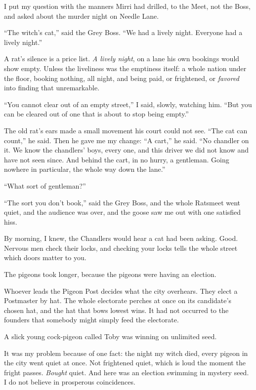 I put my question with the manners Mirri had drilled, to the Meet, not the Boss, and asked about the murder night on Needle Lane.

``The witch's cat,'' said the Grey Boss. ``We had a lively night. Everyone had a lively night.''

A rat's silence is a price list. \emph{A lively night}, on a lane his own bookings would show empty. Unless the liveliness was the emptiness itself: a whole nation under the floor, booking nothing, all night, and being paid, or frightened, or \emph{favored} into finding that unremarkable.

``You cannot clear out of an empty street,'' I said, slowly, watching him. ``But you can be cleared out of one that is about to stop being empty.''

The old rat's ears made a small movement his court could not see. ``The cat can count,'' he said. Then he gave me my change: ``A cart,'' he said. ``No chandler on it. We know the chandlers' boys, every one, and this driver we did not know and have not seen since. And behind the cart, in no hurry, a gentleman. Going nowhere in particular, the whole way down the lane.''

``What sort of gentleman?''

``The sort you don't book,'' said the Grey Boss, and the whole Ratsmeet went quiet, and the audience was over, and the goose saw me out with one satisfied hiss.

By morning, I knew, the Chandlers would hear a cat had been asking. Good. Nervous men check their locks, and checking your locks tells the whole street which doors matter to you.

\scenebreak

The pigeons took longer, because the pigeons were having an election.

Whoever leads the Pigeon Post decides what the city overhears. They elect a Postmaster by hat. The whole electorate perches at once on its candidate's chosen hat, and the hat that bows lowest wins. It had not occurred to the founders that somebody might simply feed the electorate.

A slick young cock-pigeon called Toby was winning on unlimited seed.

It was my problem because of one fact: the night my witch died, every pigeon in the city went quiet at once. Not frightened quiet, which is loud the moment the fright passes. \emph{Bought} quiet. And here was an election swimming in mystery seed. I do not believe in prosperous coincidences.

